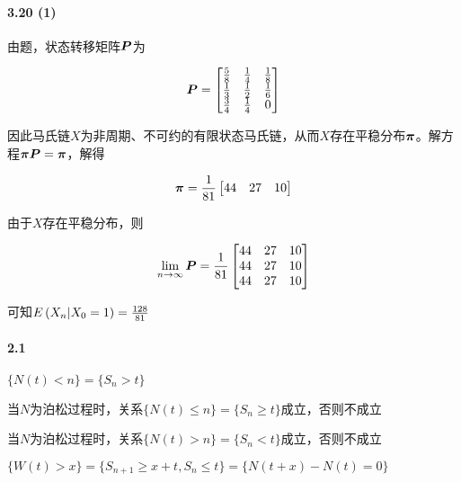 \documentclass{../notes}
\begin{document}
    \paragraph*{3.20 (1)} 由题，状态转移矩阵$\boldsymbol P$为

    \begin{equation}
        \boldsymbol P = \begin{bmatrix}
            \frac{5}{8} & \frac{1}{4} & \frac{1}{8} \\
            \frac{1}{3} & \frac{1}{2} & \frac{1}{6} \\
            \frac{3}{4} & \frac{1}{4} & 0
        \end{bmatrix}
    \end{equation}

    因此马氏链$X$为非周期、不可约的有限状态马氏链，从而$X$存在平稳分布$\boldsymbol \pi$。解方程$\boldsymbol \pi \boldsymbol P = \boldsymbol \pi$，解得

    \begin{equation}
        \boldsymbol \pi = \frac{1}{81}\begin{bmatrix}
            44 & 27 & 10
        \end{bmatrix}
    \end{equation}

    由于$X$存在平稳分布，则

    \begin{equation}
        \lim_{n\rightarrow \infty} \boldsymbol P = \frac{1}{81}\begin{bmatrix}
            44 & 27 & 10 \\
            44 & 27 & 10 \\
            44 & 27 & 10
        \end{bmatrix}
    \end{equation}

    可知$E\left(X_n|X_0 = 1\right) = \frac{128}{81}$

    \paragraph*{2.1}

    \begin{subquestions}
        \item $\{N(t) < n\} = \{S_n > t\}$
        \item 当$N$为泊松过程时，关系$\{N(t) \leq n\} = \{S_n \geq t\}$成立，否则不成立
        \item 当$N$为泊松过程时，关系$\{N(t) > n\} = \{S_n < t\}$成立，否则不成立
        \item $\{W(t) > x\} = \{S_{n+1}\geq x + t, S_{n}\leq t\} = \{N(t+x) - N(t) = 0\}$
    \end{subquestions}
\end{document}
